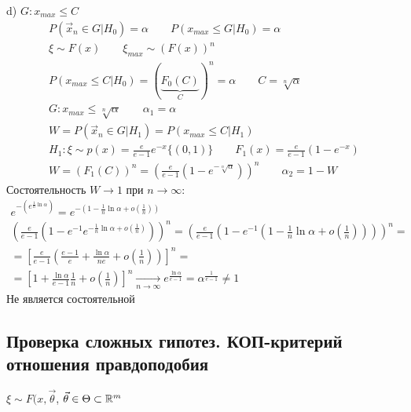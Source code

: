 \documentclass{article}
\begin{document}
\begin{eg}[Т11 из задания]
  \hr 
  d) $G: x_{max} \le C$
  \begin{gather*}
    P(\vec{x}_n \in G | H_0)=\alpha \qquad P(x_{max} \le G | H_0)=\alpha \\ 
    \xi \sim F(x) \qquad \xi_{max} \sim (F(x))^{n} \\ 
    P(x_{max} \le C | H_0) = (\underbrace{F_0(C)}_{C})^{n}=\alpha \qquad C = \sqrt[n]{\alpha} \\ 
    G: x_{max} \le \sqrt[n]{\alpha} \qquad \alpha_1=\alpha \\ 
    W=P(\vec{x}_n \in G | H_1) =P(x_{max} \le C | H_1) \\
    H_1: \xi \sim p(x)=\frac{e}{e-1}e^{-x}\{(0,1)\} \qquad F_1(x)=\frac{e}{e-1}(1-e^{-x}) \\ 
    W=(F_1(C))^{n}=\left(\frac{e}{e-1}(1-e^{-\sqrt[n]{\alpha}})\right)^{n} \qquad \alpha_2=1-W
  \end{gather*} 
  Состоятельность $W\to 1$ при $n \to \infty$:
  \begin{gather*}
    e^{-(e^{\frac{1}{n}\ln \alpha})}= e^{-(1-\frac{1}{n}\ln\alpha+o(\frac{1}{n}))} \\ 
    \left(\frac{e}{e-1}(1-e^{-1}e^{-\frac{1}{n}\ln\alpha+o(\frac{1}{n})})\right)^{n}=\left(\frac{e}{e-1}(1-e^{-1}(1-\frac{1}{n}\ln \alpha+o(\frac{1}{n})))\right)^{n} = \\ 
    = \left[\frac{e}{e-1}\left(\frac{e-1}{e}+\frac{\ln \alpha}{ne}+o(\frac{1}{n})\right)\right]^{n} = \\ 
    =\left[1+\frac{\ln\alpha}{e-1}\frac{1}{n}+o(\frac{1}{n})\right]^{n} \underset{n\to\infty}{\to} e^{\frac{\ln \alpha}{e-1}}=\alpha^{\frac{1}{e-1}}\neq1
  \end{gather*}
  Не является состоятельной
\end{eg}

\subsection{Проверка сложных гипотез. КОП-критерий отношения правдоподобия}
$\xi \sim F(x, \vec{\theta}$, $\vec{\theta} \in \Theta \subset \mathbb{R}^{m}$
\end{document}
